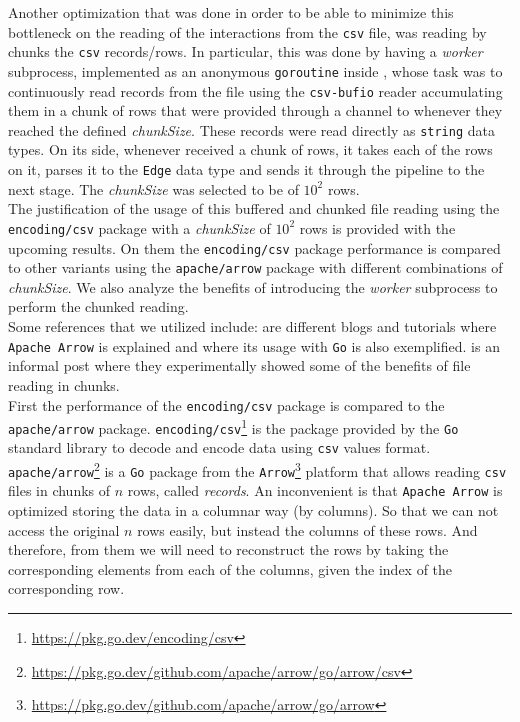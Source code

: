 Another optimization that was done in order to be able to minimize this bottleneck on the reading of the interactions from the \texttt{csv} file, was reading by chunks the \texttt{csv} records/rows. In particular, this was done by having a \textit{worker} subprocess, implemented as an anonymous \texttt{goroutine} inside \Sr, whose task was to continuously read records from the file using the \texttt{csv-bufio} reader accumulating them in a chunk of rows that were provided through a channel to \Sr whenever they reached the defined \emph{chunkSize}. These records were read directly as \texttt{string} data types. On its side, whenever \Sr received a chunk of rows, it takes each of the rows on it, parses it to the \texttt{Edge} data type and sends it through the pipeline to the next stage. The \emph{chunkSize} was selected to be of $10^2$ rows.\\

The justification of the usage of this buffered and chunked file reading using the \texttt{encoding/csv} package with a \emph{chunkSize} of $10^2$ rows is provided with the upcoming results. On them the \texttt{encoding/csv} package performance is compared to other variants using the \texttt{apache/arrow} package with different combinations of \emph{chunkSize}. We also analyze the benefits of introducing the \textit{worker} subprocess to perform the chunked reading.\\

Some references that we utilized include: \cite{exps-input-read-go_apache_arrow, exps-input-read-apache_arrow_go_match, exps-input-read-apache_arrow_medium, exps-input-read-golang_arrow_voltrondata} are different blogs and tutorials where \texttt{Apache Arrow} is explained and where its usage with \texttt{Go} is also exemplified.
\cite{exps-chunk-by-chunk-reading} is an informal post where they experimentally showed some of the benefits of file reading in chunks.\\

First the performance of the \texttt{encoding/csv} package is compared to the \texttt{apache/arrow} package. \texttt{encoding/csv}\footnote{\url{https://pkg.go.dev/encoding/csv}} is the package provided by the \texttt{Go} standard library to decode and encode data using \texttt{csv} values format.
\texttt{apache/arrow}\footnote{\url{https://pkg.go.dev/github.com/apache/arrow/go/arrow/csv}} is a \texttt{Go} package from the \texttt{Arrow}\footnote{\url{https://pkg.go.dev/github.com/apache/arrow/go/arrow}} platform that allows reading \texttt{csv} files in chunks of $n$ rows, called \emph{records}. An inconvenient is that \texttt{Apache Arrow} is optimized storing the data in a columnar way (by columns). So that we can not access the original $n$ rows easily, but instead the columns of these rows. And therefore, from them we will need to reconstruct the rows by taking the corresponding elements from each of the columns, given the index of the corresponding row.\\

